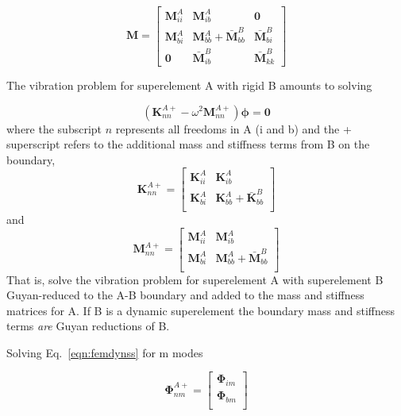 \documentclass[10pt,openany,twoside]{book}
\numberwithin{equation}{section}   %
\newcommand{\Matrix}[1]{\boldsymbol{#1}}
\newcommand{\Eqn}[1]{Eq.\ \ref{#1}}
\begin{document}
\begin{equation}
\Matrix{M} = \left[
\begin{array}{ccc}
   \Matrix{M}_{ii}^A & \Matrix{M}_{ib}^A & \Matrix{0} \\
   \Matrix{M}_{bi}^A & \Matrix{M}_{bb}^A + \Matrix{\bar{M}}_{bb}^B & \Matrix{\bar{M}}_{bi}^B \\
   \Matrix{0} & \Matrix{\bar{M}}_{ib}^B & \Matrix{\bar{M}}_{kk}^B
\end{array}
\right]			\nonumber
\end{equation}

The vibration problem for superelement A with rigid B amounts
to solving

\begin{equation}\label{eqn:femdynss}
\left( \Matrix{K}_{nn}^{A+} - \omega^2 \Matrix{M}_{nn}^{A+} \right)  \Matrix{\phi} = \Matrix{0}
\end{equation}
where the subscript $n$ represents all freedoms in A (i and b)
and the + superscript refers to the additional mass and stiffness
terms from B on the boundary,
\begin{equation}
\Matrix{K}_{nn}^{A+} = \left[
\begin{array}{cc}
   \Matrix{K}_{ii}^A & \Matrix{K}_{ib}^A  \\
   \Matrix{K}_{bi}^A & \Matrix{K}_{bb}^A + \Matrix{\bar{K}}_{bb}^B \\
\end{array}
\right]				\nonumber
\end{equation}
and
\begin{equation}
\Matrix{M}_{nn}^{A+} = \left[
\begin{array}{cc}
   \Matrix{M}_{ii}^A & \Matrix{M}_{ib}^A  \\
   \Matrix{M}_{bi}^A & \Matrix{M}_{bb}^A + \Matrix{\bar{M}}_{bb}^B \\
\end{array}
\right]
\end{equation}
That is, solve the vibration problem for superelement A
with superelement B Guyan-reduced to the A-B boundary and
added to the mass and stiffness matrices for A.
If B is a dynamic superelement the boundary mass and stiffness
terms \emph{are} Guyan reductions of B.

Solving \Eqn{eqn:femdynss} for m modes

\begin{equation}
\Matrix{\Phi}_{nm}^{A+} = \left[
\begin{array}{c}
   \Matrix{\Phi}_{im} \\
   \Matrix{\Phi}_{bm}  \\
\end{array}
\right]
\end{equation}
\end{document}
